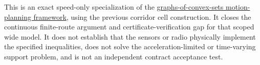 \documentclass[11pt]{article}
\begin{document}
This is an exact speed-only specialization of the
\href{https://arxiv.org/abs/2205.04422}{graphs-of-convex-sets
motion-planning framework}, using the previous corridor cell
construction. It closes the continuous finite-route argument and
certificate-verification gap for that scoped wide model. It does
not establish that the sensors or radio physically implement
the specified inequalities, does not solve the acceleration-limited
or time-varying support problem, and is not an independent contract
acceptance test.
\end{document}
